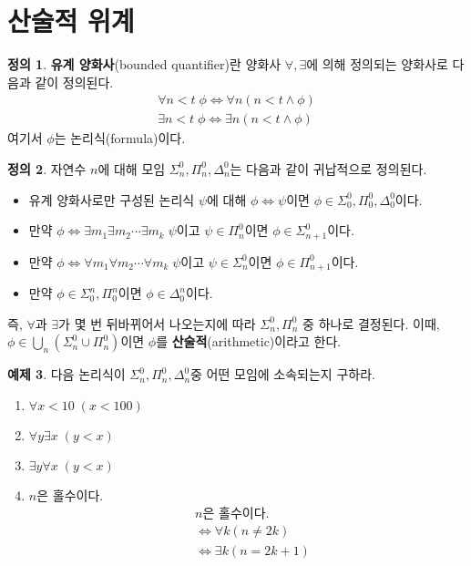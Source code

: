 \documentclass[b5paper, 10pt]{book}
\theoremstyle{definition}
\newtheorem{defn}{정의}[chapter]
\newtheorem{ex}[defn]{예제}
\begin{document}
\section{산술적 위계}
\begin{defn}
    \textbf{유계 양화사}(bounded quantifier)란 양화사 $\forall, \exists$에 의해
    정의되는 양화사로 다음과 같이 정의된다. 
    \begin{align*}
        \forall n < t \; \phi \Leftrightarrow \forall n (n < t \wedge \phi) \\
        \exists n < t \; \phi \Leftrightarrow \exists n (n < t \wedge \phi)
    \end{align*}
    여기서 $\phi$는 논리식(formula)이다. 
\end{defn}
\begin{defn}
    자연수 $n$에 대해 모임 $\Sigma_n^0, \Pi_n^0, \Delta_n^0$는 다음과 같이 귀납적으로 정의된다.
    \begin{itemize}
        \item 유계 양화사로만 구성된 논리식 $\psi$에 대해 $\phi \Leftrightarrow \psi$이면 $\phi \in 
        \Sigma_0^0, \Pi_0^0, \Delta_0^0$이다. 
        \item 만약 $\phi \Leftrightarrow \exists m_1 \exists m_2 \cdots \exists m_k \; \psi$이고
        $\psi \in \Pi_n^0$이면 $\phi \in \Sigma_{n+1}^0$이다.  
        \item 만약 $\phi \Leftrightarrow \forall m_1 \forall m_2 \cdots \forall m_k \; \psi$이고
        $\psi \in \Sigma_n^0$이면 $\phi \in \Pi_{n+1}^0$이다.  
        \item 만약 $\phi \in \Sigma_0^n, \Pi_0^n$이면 $\phi \in \Delta_0^n$이다.
    \end{itemize}
    즉, $\forall $과 $\exists$가 몇 번 뒤바뀌어서 나오는지에 따라 $\Sigma_n^0, \Pi_n^0$ 중 하나로
    결정된다. 이때, $\phi \in \bigcup_n (\Sigma_n^0 \cup \Pi_n^0 )$이면 $\phi$를 \textbf{산술적}(arithmetic)이라고
    한다.
\end{defn}
\begin{ex}
    다음 논리식이 $\Sigma_n^0, \Pi_n^0, \Delta_n^0$중 어떤 모임에 소속되는지 구하라.
    \begin{enumerate}
        \item $\forall x < 10 \; (x < 100)$ 
        \item $\forall y \exists x \; (y < x)$
        \item $\exists y \forall x \; (y < x)$
        \item $n$은 홀수이다.
        \begin{align*}
            &n\text{은 홀수이다.} \\ 
            &\Leftrightarrow \forall k (n \neq 2k) \\ 
            &\Leftrightarrow \exists k (n = 2k + 1)
        \end{align*}
    \end{enumerate}
\end{ex}
\end{document}
